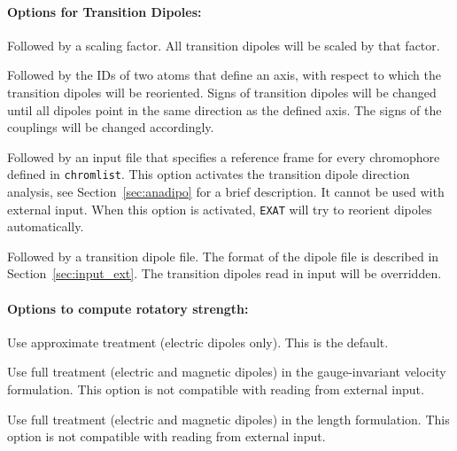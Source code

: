 \documentclass[a4paper,11pt]{article}
\begin{document}
\paragraph*{Options for Transition Dipoles:}
\begin{description}[labelsep=10pt, align=left, labelwidth=80pt,labelindent=0pt,leftmargin=90pt]
\item[\texttt{-{}-scaledipo}] Followed by a scaling factor. All transition dipoles will be scaled by that factor.  
\item[\texttt{-{}-reorient}] Followed by the IDs of two atoms that define an axis, with respect to which the transition dipoles will be reoriented. Signs of transition dipoles will be changed until all dipoles point in the same direction as the defined axis. The signs of the couplings will be changed accordingly.
\item[\texttt{-{}-anadipo}] Followed by an input file that specifies a reference frame for every chromophore defined in \texttt{chromlist}. This option activates the transition dipole direction analysis, see Section~\ref{sec:anadipo} for a brief description. It cannot be used with external input. When this option is activated, \texttt{EXAT} will try to reorient dipoles automatically.
\item[\texttt{-{}-indipo}] Followed by a transition dipole file. The format of the dipole file is described in Section~\ref{sec:input_ext}. The transition dipoles read in input will be overridden.
\end{description}

\paragraph*{Options to compute rotatory strength:}
\begin{description}[labelsep=10pt, align=left, labelwidth=80pt,labelindent=0pt,leftmargin=90pt]
\item[\texttt{-{}-mu}]  Use approximate treatment (electric dipoles only). This is the default.
\item[\texttt{-{}-mag}] Use full treatment (electric and magnetic dipoles) in the gauge-invariant velocity formulation. This option is not compatible with reading from external input.
\item[\texttt{-{}-length}] Use full treatment (electric and magnetic dipoles) in the length formulation. This option is not compatible with reading from external input. 
\end{description}
\end{document}
